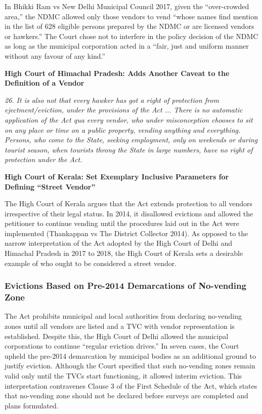 \documentclass[a4paper, 12pt, twoside]{article}
\begin{document}
In Bhikki Ram vs New Delhi Municipal Council 2017, given the “over-crowded area,” the NDMC allowed only those vendors to vend “whose names find mention in the list of 628 eligible persons prepared by the NDMC or are licensed vendors or hawkers.” The Court chose not to interfere in the policy decision of the NDMC as long as the municipal corporation acted in a “fair, just and uniform manner without any favour of any kind.”



\textbf{High Court of Himachal Pradesh: Adds Another Caveat to the Definition of a Vendor}


\textit{26. It is also not that every hawker has got a right of protection from ejectment/eviction, under the provisions of the Act ... There is no automatic application of the Act qua every vendor, who under misconception chooses to sit on any place or time on a public property, vending anything and everything. Persons, who come to the State, seeking employment, only on weekends or during tourist season, when tourists throng the State in large numbers, have no right of protection under the Act.}


\textbf{High Court of Kerala: Set Exemplary Inclusive Parameters for Defining “Street Vendor”}

The High Court of Kerala argues that the Act extends protection to all vendors irrespective of their legal status. In 2014, it disallowed evictions and allowed the petitioner to continue vending until the procedures laid out in the Act were implemented (Thankappan vs The District Collector 2014). As opposed to the narrow interpretation of the Act adopted by the High Court of Delhi and Himachal Pradesh in 2017 to 2018, the High Court of Kerala sets a desirable example of who ought to be considered a street vendor.

\subsubsection*{Evictions Based on Pre-2014 Demarcations of No-vending Zone}

The Act prohibits municipal and local authorities from declaring no-vending zones until all vendors are listed and a TVC with vendor representation is established. Despite this, the High Court of Delhi allowed the municipal corporations to continue “regular eviction drives.” In seven cases, the Court upheld the pre-2014 demarcation by municipal bodies as an additional ground to justify eviction.  Although the Court specified that such no-vending zones remain valid only until the TVCs start functioning, it allowed interim eviction. This interpretation contravenes Clause 3 of the First Schedule of the Act, which states that no-vending zone should not be declared before surveys are completed and plans formulated.
\end{document}
